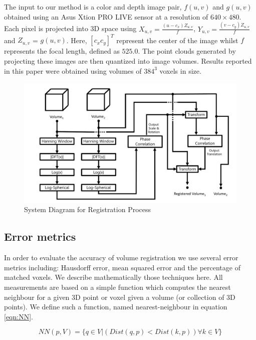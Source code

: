 The input to our method is a color and depth image pair, $f(u,v)$ and $g(u,v)$ obtained using an Asus Xtion PRO LIVE sensor at a resolution of $640 \times 480$. Each pixel is projected into 3D space using $X_{u,v} = \frac{(u - c_x)Z_{u,v}}{f}$, $Y_{u,v} = \frac{(v - c_y)Z_{u,v}}{f}$ and $Z_{u,v}$ = $g(u,v)$. 
Here, $[c_x c_y]^T$ represent the center of the image whilst $f$ represents the focal length, defined as $525.0$. The point clouds generated by projecting these images are then quantized into image volumes. Results reported in this paper were obtained using volumes of $384^3$ voxels in size.

\begin{figure}[t]
\centering
\includegraphics[width=6.0in]{images/ch2/pipeline2}
\caption{System Diagram for Registration Process}
\label{fig:PIPELINE}
\end{figure}


\subsection{Error metrics}

\label{metricsSection}

In order to evaluate the accuracy of volume registration we use several error metrics including: Hausdorff error, mean squared error and the percentage of matched voxels. We describe mathematically those techniques here. All measurements are based on a simple function which computes the nearest neighbour for a given 3D point or voxel given a volume (or collection of 3D points). We define such a function, named nearest-neighbour in equation \ref{eqn:NN}.

\begin{equation} \label{eqn:NN}
NN(p, V) =  \{ q \in V | (Dist(q, p) < Dist(k, p))  \forall k \in V \}
\end{equation}

